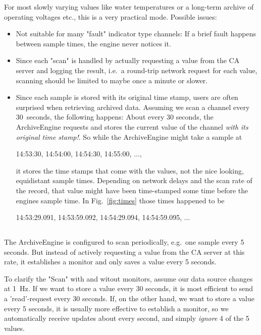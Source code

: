 For most slowly varying values like water temperatures or a long-term
archive of operating voltages etc., this is a very practical mode.
Possible issues:
\begin{itemize}
\item
Not suitable for many "fault" indicator type channels:
If a brief fault happens between sample times, the engine never notices
it.
\item
Since each "scan" is handled
by actually requesting a value from the CA server and logging the
result, i.e.\ a round-trip network request for each value,
scanning should be limited to maybe once a minute or slower.
\item
Since each sample is stored with its original time stamp, 
users are often surprised when retrieving archived data.
Assuming we scan a channel every 30~seconds, the following
happens: About every 30 seconds, the ArchiveEngine requests and stores
the current value of the channel \emph{with its original time stamp!}.
So while the ArchiveEngine might take a sample at
\begin{center}
14:53:30, 14:54:00, 14:54:30, 14:55:00, ...,
\end{center}
it stores the time stamps that come with the values, not the nice looking,
equidistant sample times. Depending on network
delays and the scan rate of the record, that value might have been time-stamped
some time before the engines sample time.
In Fig.~\ref{fig:times} those times happened to be
\begin{center}
14:53:29.091,  14:53:59.092, 14:54:29.094,  14:54:59.095, ...
\end{center}
\end{itemize}

\subsection{}
The ArchiveEngine is configured to scan periodically,
e.g.\ one sample every 5 seconds. But instead of actively requesting a
value from the CA server at this rate, it establishes a monitor and
only saves a value every 5 seconds.

To clarify the "Scan" with and witout monitors, assume our data source changes
at 1~Hz. If we want to store a value every 30 seconds, it is most efficient to
send a 'read'-request every 30 seconds. If, on the other hand, we want
to store a value every 5 seconds, it is usually more effective to
establish a monitor, so we automatically receive updates about every
second, and simply \emph{ignore} 4 of the 5 values.

